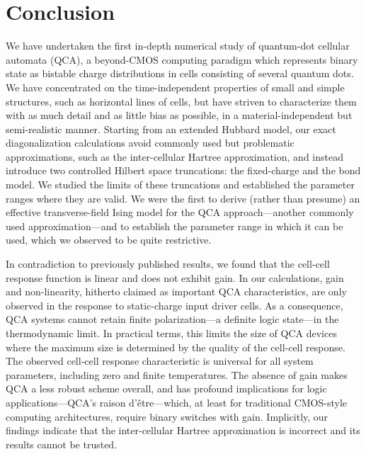 \chapter{Conclusion}

We have undertaken the first in-depth numerical study of quantum-dot cellular
automata (QCA), a beyond-CMOS computing paradigm which represents binary state
as bistable charge distributions in cells consisting of several quantum dots. We
have concentrated on the time-independent properties of small and simple
structures, such as horizontal lines of cells, but have striven to characterize them
with as much detail and as little bias as possible, in a material-independent but
semi-realistic manner. Starting from an extended Hubbard model, our exact
diagonalization calculations avoid commonly used but problematic approximations,
such as the inter-cellular Hartree approximation, and instead introduce two
controlled Hilbert space truncations: the fixed-charge and the bond model. We
studied the limits of these truncations and established the parameter ranges
where they are valid. We were the first to derive (rather than presume) an effective
transverse-field Ising model for the QCA approach---another commonly used
approximation---and to establish the parameter range in which it can be used,
which we observed to be quite restrictive.

In contradiction to previously published results, we found that the cell-cell
response function is linear and does not exhibit gain. In our calculations, gain
and non-linearity, hitherto claimed as important QCA characteristics, are only
observed in the response to static-charge input driver cells. As a consequence,
QCA systems cannot retain finite polarization---a definite logic state---in the
thermodynamic limit. In practical terms, this limits the size of QCA devices
where the maximum size is determined by the quality of the cell-cell response.
The observed cell-cell response characteristic is universal for all system
parameters, including zero and finite temperatures. The absence of gain makes
QCA a less robust scheme overall, and has profound implications for logic
applications---QCA's raison d'\^etre---which, at least for traditional
CMOS-style computing architectures, require binary switches with gain.
Implicitly, our findings indicate that the inter-cellular Hartree approximation
is incorrect and its results cannot be trusted.

